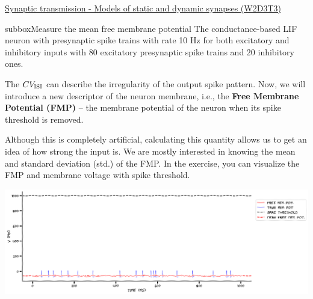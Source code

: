 \begin{textbox}{\href{https://compneuro.neuromatch.io/tutorials/W2D3_BiologicalNeuronModels/student/W2D3_Tutorial3.html}{Synaptic transmission - Models of static and dynamic synapses (W2D3T3)} }
\begin{subbox}{subbox}{Measure the mean free membrane potential}
\scriptsize
The conductance-based LIF neuron with presynaptic spike trains with rate 10 Hz for both excitatory and inhibitory inputs with 80 excitatory presynaptic spike trains and 20 inhibitory ones.

The $CV_{\rm ISI}$ can describe the irregularity of the output spike pattern. Now, we will introduce a new descriptor of the neuron membrane, i.e., the  \textbf{Free Membrane Potential (FMP)} -- the membrane potential of the neuron when its spike threshold is removed. 

Although this is completely artificial, calculating this quantity allows us to get an idea of how strong the input is. We are mostly interested in knowing the mean and standard deviation (std.) of the FMP. In the exercise, you can visualize the FMP and membrane voltage with spike threshold.
\begin{center}
    
\includegraphics[scale=0.14]{Figures/BNM/LIF_Figure9.png}
\end{center}

\end{subbox}

\end{textbox}

